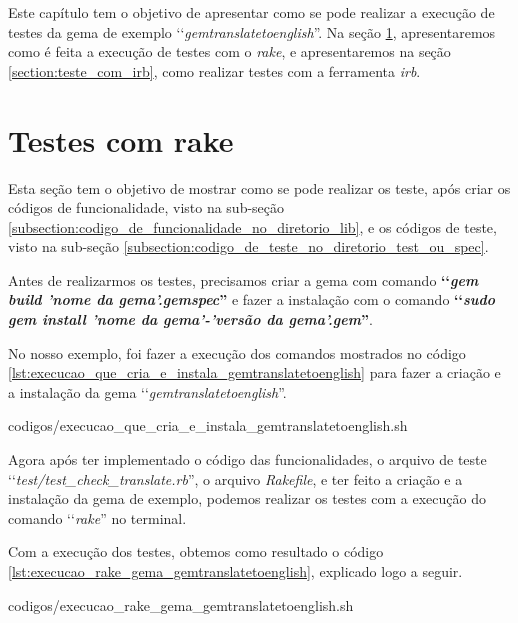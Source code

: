 Este capítulo tem o objetivo de apresentar como se pode realizar a execução de testes da gema de
exemplo ‘‘\emph{gemtranslatetoenglish}''. Na seção \ref{section:teste_com_rake}, apresentaremos
como é feita a execução de testes com o \emph{rake}, e apresentaremos na seção
\ref{section:teste_com_irb}, como realizar testes com a ferramenta \emph{irb}.


\section{Testes com rake}
\label{section:teste_com_rake}


Esta seção tem o objetivo de mostrar como se pode realizar os teste, após criar os códigos de
funcionalidade, visto na sub-seção \ref{subsection:codigo_de_funcionalidade_no_diretorio_lib}, e os códigos
de teste, visto na sub-seção \ref{subsection:codigo_de_teste_no_diretorio_test_ou_spec}.

Antes de realizarmos os testes, precisamos criar a gema com comando \textbf{‘‘\emph{gem build 'nome da gema'.gemspec}''}
e fazer a instalação com o comando \textbf{‘‘\emph{sudo gem install 'nome da gema'-'versão da gema'.gem}''}.

No nosso exemplo, foi fazer a execução dos comandos mostrados no código
\ref{lst:execucao_que_cria_e_instala_gemtranslatetoenglish} para fazer a criação e a instalação da gema
‘‘\emph{gemtranslatetoenglish}''.


{codigos/execucao_que_cria_e_instala_gemtranslatetoenglish.sh }

Agora após ter implementado o código das funcionalidades, o arquivo de teste
‘‘\emph{test/test\_check\_translate.rb}'', o arquivo \emph{Rakefile}, e ter feito a criação e a instalação
da gema de exemplo, podemos realizar os testes com a execução do comando ‘‘\emph{rake}'' no terminal.

Com a execução dos testes, obtemos como resultado o código \ref{lst:execucao_rake_gema_gemtranslatetoenglish},
explicado logo a seguir.


{codigos/execucao_rake_gema_gemtranslatetoenglish.sh }

